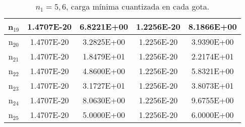 \documentclass{article}
\begin{document}
\begin{enumerate}
\begin{table}[h!]
\begin{tabular}{|c|c|c|c|c|}
       \hline       
       n$_{19}$  & 1.4707E-20 & 6.8221E+00 & 1.2256E-20 & 8.1866E+00\\
       \hline       
       n$_{20}$  & 1.4707E-20 & 3.2825E+00 & 1.2256E-20 & 3.9390E+00\\
       \hline       
       n$_{21}$  & 1.4707E-20 & 1.8479E+01 & 1.2256E-20 & 2.2174E+01\\
       \hline       
       n$_{22}$  & 1.4707E-20 & 4.8600E+00 & 1.2256E-20 & 5.8321E+00\\
       \hline       
       n$_{23}$  & 1.4707E-20 & 3.1727E+01 & 1.2256E-20 & 3.8073E+01\\
       \hline       
       n$_{24}$  & 1.4707E-20 & 8.0630E+00 & 1.2256E-20 & 9.6755E+00\\
       \hline       
       n$_{25}$  & 1.4707E-20 & 5.0000E+00 & 1.2256E-20 & 6.0000E+00\\
       \hline

    \end{tabular}
    \caption{$n_{1}=5,6$, carga mínima cuantizada en cada gota.}
    \label{tab:my_label}
\end{table}



\end{enumerate}
\end{document}
